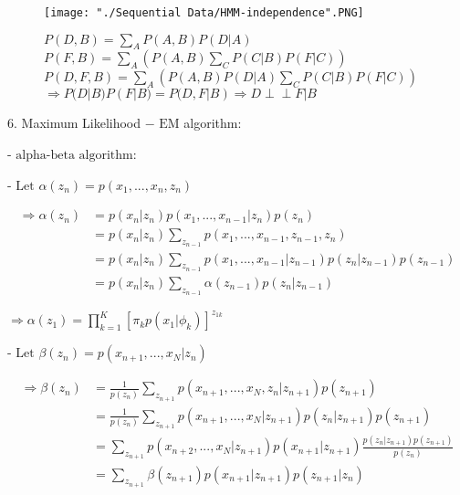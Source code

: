 \begin{itemize}
\begin{itemize}
\begin{itemize}
\begin{figure}[h]
\begin{minipage}{0.5\linewidth}
		    \texttt{[image: "./Sequential Data/HMM-independence".PNG]}
		    \end{minipage}
		    \begin{minipage}{0.5\linewidth}
		    \caption{
		    $\displaystyle P(D,B) = \sum_A P(A,B) P(D|A)$ \\
		    $\displaystyle P(F,B) = \sum_A\left( P(A,B) \sum_C P(C|B)P(F|C) \right)$ \\
		    $\displaystyle P(D,F,B) =\sum_A \left( P(A,B) P(D|A)\sum_C P(C|B)P(F|C) \right)$ \\
		    $\Rightarrow P(D|B)P(F|B) = P(D,F|B) \Rightarrow D \perp\!\!\!\perp F | B$
		    }
		    \end{minipage}
		\end{figure}
		
		\end{itemize}
	\end{itemize}
\end{itemize}

6. Maximum Likelihood $-\text{ EM}$ algorithm:
     

   - $\text{alpha-beta algorithm}$: 


     - $\text{Let }\alpha(z_n) = p(x_1,...,x_n,z_n)$ 

       \begin{align} \Rightarrow \alpha(z_n) &= p(x_n|z_n)p(x_1,...,x_{n-1}|z_n)p(z_n) \\ &= \displaystyle p(x_n|z_n)\sum_{z_{n-1}}p(x_1,...,x_{n-1},z_{n-1},z_n) \\ &= p(x_n|z_n) \sum_{z_{n-1}} p(x_1,...,x_{n-1}|z_{n-1})p(z_n|z_{n-1})p(z_{n-1}) \\ &= p(x_n|z_n) \sum_{z_{n-1}}\alpha(z_{n-1}) p(z_n|z_{n-1}) \end{align}

       $\displaystyle \Rightarrow \alpha(z_1) = \prod_{k=1}^K [\pi_k p(x_1|\phi_k)]^{z_{1k}}$ 

     - $\text{Let } \beta(z_n) = p(x_{n+1},...,x_N|z_n)$ 

       \begin{align} \displaystyle \Rightarrow \beta(z_n) &= \frac 1 {p(z_n)} \sum_{z_{n+1}}p(x_{n+1}, ..., x_N, z_n | z_{n+1}) p(z_{n+1}) \\ &= \frac 1 {p(z_n)} \sum_{z_{n+1}}p(x_{n+1}, ..., x_N | z_{n+1})p(z_n | z_{n+1}) p(z_{n+1})  \\ &= \sum_{z_{n+1}}p(x_{n+2},...,x_N|z_{n+1})p(x_{n+1}|z_{n+1}) \frac{p(z_n|z_{n+1})p(z_{n+1}) }{p(z_n)} \\ &= \sum_{z_{n+1}} \beta(z_{n+1}) p(x_{n+1} | z_{n+1}) p(z_{n+1}|z_n) \end{align}

